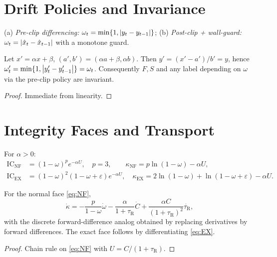 \documentclass[onecolumn,amsmath,amssymb,aps]{revtex4-2}
\newcommand{\eps}{\varepsilon}
\newcommand{\kappaL}{\kappa}
\newcommand{\IC}{\mathrm{IC}}
\newcommand{\TauR}{\tau_\mathrm{R}}
\newcommand{\om}{\omega}
\newcommand{\Curv}{C}
\newcommand{\Uvar}{U}
\newcommand{\alp}{\alpha}
\begin{document}
\section{Drift Policies and Invariance}\label{sec:drift}
\begin{definition}
(a) \emph{Pre-clip differencing:} $\om_t=\min\{1,\abs{y_t-y_{t-1}}\}$;
(b) \emph{Post-clip + wall-guard:} $\om_t=\abs{\hat x_t-\hat x_{t-1}}$ with a monotone guard.
\end{definition}
\begin{lemma}\label{lem:unit}
Let $x'=\alpha x+\beta$, $(a',b')=(\alpha a+\beta,\alpha b)$. Then $y'=(x'-a')/b'=y$, hence $\om'_t=\min\{1,\abs{y'_t-y'_{t-1}}\}=\om_t$. Consequently $F,S$ and any label depending on $\om$ via the pre-clip policy are invariant.
\end{lemma}
\begin{proof}
Immediate from linearity.
\end{proof}

\section{Integrity Faces and Transport}\label{sec:faces}
\begin{definition}[Faces]
For $\alp>0$:
\begin{align}
\IC_{\mathrm{NF}}&=(1-\om)^p e^{-\alp \Uvar},\quad p=3,\qquad
\kappaL_{\mathrm{NF}}=p\ln(1-\om)-\alp \Uvar, \label{eq:NF}\\
\IC_{\mathrm{EX}}&=(1-\om)^2(1-\om+\eps) e^{-\alp \Uvar},\quad
\kappaL_{\mathrm{EX}}=2\ln(1-\om)+\ln(1-\om+\eps)-\alp \Uvar. \label{eq:EX}
\end{align}
\end{definition}

\begin{theorem}\label{thm:transport}
For the normal face \eqref{eq:NF},
\begin{equation}
\dot{\kappaL}= -\frac{p}{1-\om}\dot{\om}
-\frac{\alp}{1+\TauR}\dot{\Curv}
+\frac{\alp \Curv}{(1+\TauR)^2}\dot{\TauR},
\end{equation}
with the discrete forward-difference analog obtained by replacing derivatives by forward differences. The exact face follows by differentiating \eqref{eq:EX}.
\end{theorem}
\begin{proof}
Chain rule on \eqref{eq:NF} with $\Uvar=\Curv/(1+\TauR)$.
\end{proof}
\end{document}
